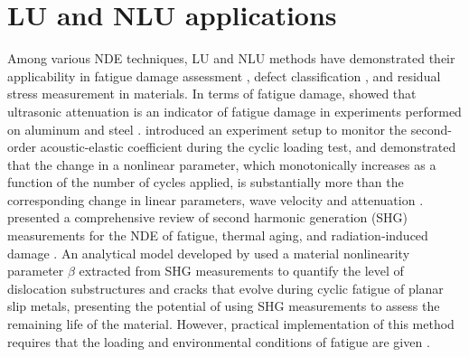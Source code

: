 \section{LU and NLU applications}
Among various NDE techniques, LU and NLU methods have demonstrated their applicability in fatigue damage assessment \cite{nde-lu-fatigue-JOSHI1972577, nde-nlu-fatigue-NAGY1998375,nde-nlu-review-Matlack2014, nde-nlu-fatigue-Cantrell}, defect classification \cite{nde-lu-ml-defect-Sambath2011,nde-lu-ml-defect-s19194216}, and residual stress measurement \cite{nde-lu-rs-Man1987,nde-lu-rs-TANALA199583,nde-lu-rs-LIU2018178} in materials. In terms of fatigue damage,  showed that ultrasonic attenuation is an indicator of fatigue damage in experiments performed on aluminum and steel \cite{nde-lu-fatigue-JOSHI1972577}.  introduced an experiment setup to monitor the second-order acoustic-elastic coefficient during the cyclic loading test, and demonstrated that the change in a nonlinear parameter, which monotonically increases as a function of the number of cycles applied, is substantially more than the corresponding change in linear parameters, wave velocity and attenuation \cite{nde-nlu-fatigue-NAGY1998375}.  presented a comprehensive review of second harmonic generation (SHG) measurements for the NDE of fatigue, thermal aging, and radiation‐induced damage \cite{nde-nlu-review-Matlack2014}. An analytical model developed by  used a material nonlinearity parameter $ \beta $ extracted from SHG measurements to quantify the level of dislocation substructures and cracks that evolve during cyclic fatigue of planar slip metals, presenting the potential of using SHG measurements to assess the remaining life of the material. However, practical implementation of this method requires that the loading and environmental conditions of fatigue are given \cite{nde-nlu-fatigue-Cantrell}.

